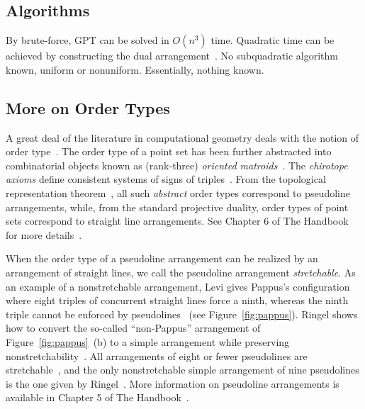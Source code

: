 
\subsection{Algorithms}

By brute-force, GPT can be solved in \(O(n^3)\) time.
%
Quadratic time can be achieved by constructing the dual
arrangement~\cite[Theorem 24.4.1]{Hal04}.
%
No subquadratic algorithm known, uniform or nonuniform.
%
Essentially, nothing known.


\subsection{More on Order Types}

A great deal of the literature in computational geometry deals with the notion
of order type~\cite{%
AAK02a,
AAK02b,
ACKLV16,
AKPV14,
AK01,
AK05,
AKMPW15,
AMP13,
Al86,
AILOW14,
BLSWZ93,
BMS01,
BRS92,
Epp18,
EHN99,
Fe96,
FV11,
FL78,
Go80,
GP83,
GP84,
GP86,
GP91,
GP93,
GPS89,
HM94,
HMMS11,
Knu92,
Le26,
MMIB12,
NV98,
Ri89,
RZ04,
Ri56,
St97%
}.
The order type of a point set has been further abstracted into combinatorial
objects known as (rank-three) \emph{oriented matroids}~\cite{FL78}. The
\emph{chirotope axioms} define consistent systems of signs of
triples~\cite{BLSWZ93}.
%
From the topological representation theorem~\cite{BMS01}, all such
\emph{abstract} order types correspond to pseudoline arrangements, while, from
the standard projective duality, order types of point sets correspond to
straight line arrangements. See Chapter 6 of The Handbook for more
details~\cite{RZ04}.

When the order type of a pseudoline arrangement can be realized by an
arrangement of straight lines, we call the pseudoline arrangement
\emph{stretchable}.
%
As an example of a nonstretchable arrangement, Levi gives Pappus's
configuration where eight triples of concurrent straight lines force a ninth,
whereas the ninth triple cannot be enforced by pseudolines~\cite{Le26} (see
Figure~\ref{fig:pappus}).
%
Ringel shows how to convert the so-called ``non-Pappus'' arrangement of
Figure~\ref{fig:pappus}~(b) to a simple arrangement while preserving
nonstretchability~\cite{Ri56}.
%
All arrangements of eight or fewer pseudolines are stretchable~\cite{GP80}, and
the only nonstretchable simple arrangement of nine pseudolines is the one given
by Ringel~\cite{Ri89}.
%
More information on pseudoline arrangements is available in Chapter 5 of The
Handbook~\cite{Go04}.

